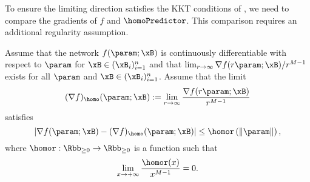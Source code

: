 To ensure the limiting direction satisfies the KKT conditions of , we need to compare the gradients of $f$ and $\homoPredictor$. This comparison requires an additional regularity assumption.

\begin{comment}
\begin{assumption}[Near-homogeneous gradient]
\label{asp:strongerhomo}
Assume that the network $f(\param;\xB)$ is differentiable with respect to $\param$ for $\xB \in (\xB_i)_{i=1}^n$. \JW{check $M=1$ case?}
Moreover, assume that $M\ge 2$ and each component of its gradient, $[\nabla f(\param; \xB)]_j$ for $j=1,\dots,D$, 
is near-$(M-1)$-homogeneous with polynomials $\homor(\cdot)$ and $\homos(\cdot)$.
\end{assumption}
\end{comment}

\begin{assumption}
\label{asp:strongerhomo}
Assume that the network $f(\param;\xB)$ is continuously differentiable with respect to $\param$ for $\xB \in (\xB_i)_{i=1}^n$ and that $\lim_{r \to \infty} {\nabla f (r \param; \xB)}/{r^{M-1}}$ exists for all $\param$ and $\xB \in (\xB_i)_{i=1}^n$. Assume that the limit
\begin{equation*}
    (\nabla f)_{\homo} (\param; \xB) := \lim_{r \to \infty} \frac{\nabla f (r \param; \xB)}{r^{M-1}}
\end{equation*}
satisfies 
\begin{equation*}
    \left\vert \nabla f(\param; \xB) - (\nabla f)_\homo (\param; \xB) \right\vert \le \homor \left( \| \param \| \right),
\end{equation*}
where $\homor: \Rbb_{\ge 0} \to \Rbb_{\ge 0}$ is a function such that
\begin{equation*}
    \lim_{x \to + \infty} \frac{\homor(x)}{x^{M - 1}} = 0.
\end{equation*}
\end{assumption}

